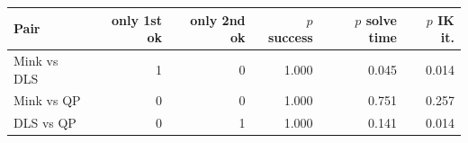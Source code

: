 \begin{tabular}{lrrrrr}
\toprule
Pair & only 1st ok & only 2nd ok & $p$ success & $p$ solve time & $p$ IK it.\\
\midrule
Mink vs DLS & 1 & 0 & 1.000 & 0.045 & 0.014\\
Mink vs QP & 0 & 0 & 1.000 & 0.751 & 0.257\\
DLS vs QP & 0 & 1 & 1.000 & 0.141 & 0.014\\
\bottomrule
\end{tabular}
